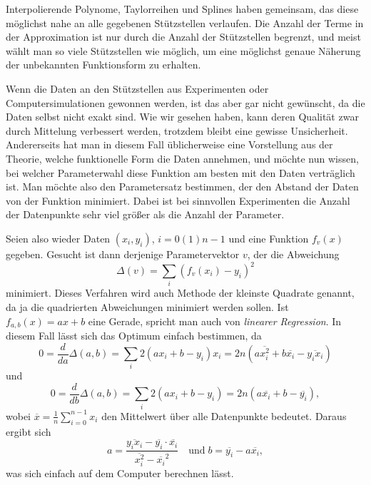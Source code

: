 Interpolierende Polynome, Taylorreihen und Splines haben gemeinsam,
das diese möglichst nahe an alle gegebenen Stützstellen verlaufen. Die
Anzahl der Terme in der Approximation ist nur durch die Anzahl der
Stützstellen begrenzt, und meist wählt man so viele Stützstellen wie
möglich, um eine möglichst genaue Näherung der unbekannten
Funktionsform zu erhalten.

Wenn die Daten an den Stützstellen aus Experimenten oder
Computersimulationen gewonnen werden, ist das aber gar nicht
gewünscht, da die Daten selbst nicht exakt sind. Wie wir gesehen
haben, kann deren Qualität zwar durch Mittelung verbessert werden,
trotzdem bleibt eine gewisse Unsicherheit.  Andererseits hat man in
diesem Fall üblicherweise eine Vorstellung aus der Theorie, welche
funktionelle Form die Daten annehmen, und möchte nun wissen, bei
welcher Parameterwahl diese Funktion am besten mit den Daten
verträglich ist. Man möchte also den Parametersatz bestimmen, der den
Abstand der Daten von der Funktion minimiert. Dabei ist bei sinnvollen
Experimenten die Anzahl der Datenpunkte sehr viel größer als die
Anzahl der Parameter.

Seien also wieder Daten $(x_i, y_i)$, $i=0(1)n-1$ und eine Funktion
$f_v(x)$ gegeben. Gesucht ist dann derjenige Parametervektor $v$, der
die Abweichung
\begin{equation}
  \label{eq:leastsq}
  \Delta(v) = \sum_i (f_v(x_i) - y_i)^2
\end{equation}
minimiert. Dieses Verfahren wird auch Methode der kleinste Quadrate
genannt, da ja die quadrierten Abweichungen minimiert werden
sollen. Ist $f_{a,b}(x) = ax + b$ eine Gerade, spricht man auch von
\emph{linearer Regression}. In diesem Fall lässt
sich das Optimum einfach bestimmen, da
\begin{equation}
  0 = \frac{d}{da} \Delta(a,b) = \sum_i 2 (a x_i + b - y_i)x_i
  = 2n \left(a  \overline{x_i^2} + b \overline{x_i} -
    \overline{y_ix_i} \right)
\end{equation}
und
\begin{equation}
  0 = \frac{d}{db} \Delta(a,b) = \sum_i 2 (a x_i + b - y_i)
  = 2n \left(a  \overline{x_i} + b - \overline{y_i} \right),
\end{equation}
wobei $\overline{x} = \frac{1}{n} \sum_{i=0}^{n-1} x_i$ den Mittelwert
über alle Datenpunkte bedeutet. Daraus ergibt sich
\begin{equation}
  a = \frac{\overline{y_ix_i} -
    \overline{y_i}\cdot\overline{x_i}}{\overline{x_i^2}-\overline{x_i}^2}
  \quad\text{und}\;
  b = \overline{y_i} - a \overline{x_i},
\end{equation}
was sich einfach auf dem Computer berechnen lässt.

